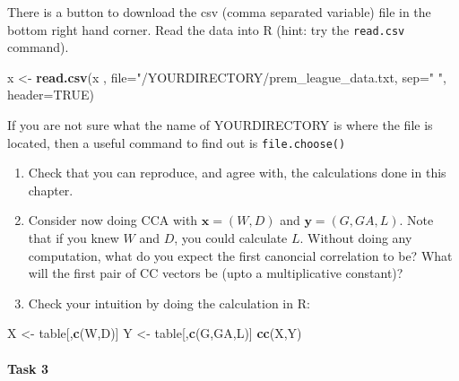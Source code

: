 \documentclass[
]{book}
\newenvironment{Shaded}{\begin{snugshade}}{\end{snugshade}}
\newcommand{\AttributeTok}[1]{\textcolor[rgb]{0.13,0.29,0.53}{#1}}
\newcommand{\FunctionTok}[1]{\textcolor[rgb]{0.13,0.29,0.53}{\textbf{#1}}}
\newcommand{\NormalTok}[1]{#1}
\newcommand{\OtherTok}[1]{\textcolor[rgb]{0.56,0.35,0.01}{#1}}
\newcommand{\StringTok}[1]{\textcolor[rgb]{0.31,0.60,0.02}{#1}}
\theoremstyle{definition}
\theoremstyle{definition}
\theoremstyle{definition}
\theoremstyle{definition}
\theoremstyle{remark}
\begin{document}
There is a button to download the csv (comma separated variable) file in the bottom right hand corner. Read the data into R (hint: try the \texttt{read.csv} command).

\begin{Shaded}
\begin{Highlighting}[]
\NormalTok{x }\OtherTok{\textless{}{-}} \FunctionTok{read.csv}\NormalTok{(x , }\AttributeTok{file=}\StringTok{"/YOURDIRECTORY/prem\_league\_data.txt, }
\StringTok{sep="} \StringTok{", header=TRUE)}
\end{Highlighting}
\end{Shaded}

If you are not sure what the name of YOURDIRECTORY is where the file is located, then a useful command to find out is \texttt{file.choose()}

\begin{enumerate}
\def\labelenumi{\roman{enumi}.}
\item
  Check that you can reproduce, and agree with, the calculations done in this chapter.
\item
  Consider now doing CCA with \(\mathbf x=(W,D)\) and \(\mathbf y=(G,GA, L)\). Note that if you knew \(W\) and \(D\), you could calculate \(L\). Without doing any computation, what do you expect the first canoncial correlation to be? What will the first pair of CC vectors be (upto a multiplicative constant)?
\item
  Check your intuition by doing the calculation in R:
\end{enumerate}

\begin{Shaded}
\begin{Highlighting}[]
\NormalTok{X }\OtherTok{\textless{}{-}}\NormalTok{ table[,}\FunctionTok{c}\NormalTok{(}\StringTok{\textquotesingle{}W\textquotesingle{}}\NormalTok{,}\StringTok{\textquotesingle{}D\textquotesingle{}}\NormalTok{)] }
\NormalTok{Y }\OtherTok{\textless{}{-}}\NormalTok{ table[,}\FunctionTok{c}\NormalTok{(}\StringTok{\textquotesingle{}G\textquotesingle{}}\NormalTok{,}\StringTok{\textquotesingle{}GA\textquotesingle{}}\NormalTok{,}\StringTok{\textquotesingle{}L\textquotesingle{}}\NormalTok{)] }
\FunctionTok{cc}\NormalTok{(X,Y)}
\end{Highlighting}
\end{Shaded}

\hypertarget{task-3}{%
\paragraph*{Task 3}\label{task-3}}
\end{document}
